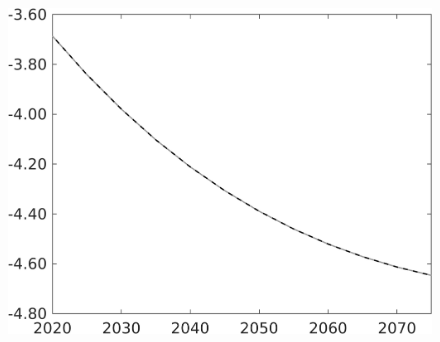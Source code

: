 \documentclass[12pt]{article}
\begin{document}
\begin{figure}[h!!]
\begin{minipage}[]{0.32\textwidth}
	\end{minipage}	
	\begin{minipage}[]{0.32\textwidth}
		\includegraphics[width=1\textwidth]{../../codding_model/own_basedOnFried/optimalPol_010922_revision/figures/all_13Sept22/PerdifNoTauf_regime0_CompTaul_pn_spillover0_nsk1_xgr0_knspil1_sep1_LFlimit0_emsbase0_countec0_GovRev0_etaa0.79_lgd0.png}
	\end{minipage}	
\end{figure}
\end{document}
